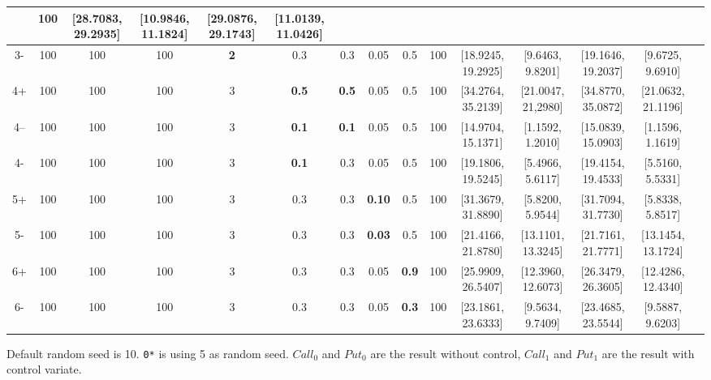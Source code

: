 \documentclass[11pt,a4paper]{article}
\begin{document}
\begin{table}[h]
{\begin{tabular}{|c|c|c|c|c|c|c|c|c|c|c|c|c|c|c|}
            & 100 
            & [28.7083, 29.2935] & [10.9846, 11.1824] 
            & [29.0876, 29.1743] & [11.0139, 11.0426]\\
            \hline
            3- & 100 & 100 & 100 & \textbf{2} & 0.3 & 0.3 & 0.05 & 0.5 
            & 100 
            & [18.9245, 19.2925] & [9.6463, 9.8201] 
            & [19.1646, 19.2037] & [9.6725, 9.6910]\\
            \hline
            4+ & 100 & 100 & 100 & 3 & \textbf{0.5} & \textbf{0.5} & 0.05 & 0.5 
            & 100
            & [34.2764, 35.2139] & [21.0047, 21,2980]
            & [34.8770, 35.0872] & [21.0632, 21.1196]\\
            \hline
            4--& 100 & 100 & 100 & 3 & \textbf{0.1} & \textbf{0.1} & 0.05 & 0.5 
            & 100
            & [14.9704, 15.1371] & [1.1592, 1.2010]
            & [15.0839, 15.0903] & [1.1596, 1.1619]\\
            \hline
            4- & 100 & 100 & 100 & 3 & \textbf{0.1} & 0.3 & 0.05 & 0.5 
            & 100
            & [19.1806, 19.5245] & [5.4966, 5.6117]
            & [19.4154, 19.4533] & [5.5160, 5.5331]\\
            \hline
            5+ & 100 & 100 & 100 & 3 & 0.3 & 0.3 & \textbf{0.10} & 0.5 
            & 100
            & [31.3679, 31.8890] & [5.8200, 5.9544] 
            & [31.7094, 31.7730] & [5.8338, 5.8517]\\
            \hline
            5- & 100 & 100 & 100 & 3 & 0.3 & 0.3 & \textbf{0.03} & 0.5 
            & 100
            & [21.4166, 21.8780] & [13.1101, 13.3245]
            & [21.7161, 21.7771] & [13.1454, 13.1724]\\
            \hline
            6+ & 100 & 100 & 100 & 3 & 0.3 & 0.3 & 0.05 & \textbf{0.9}
            & 100
            & [25.9909, 26.5407] & [12.3960, 12.6073]
            & [26.3479, 26.3605] & [12.4286, 12.4340]\\
            \hline
            6- & 100 & 100 & 100 & 3 & 0.3 & 0.3 & 0.05 & \textbf{0.3}
            & 100
            & [23.1861, 23.6333] & [9.5634, 9.7409]
            & [23.4685, 23.5544] & [9.5887, 9.6203]\\
            \hline
    \end{tabular}
        }
    \end{table}

    Default random seed is 10. 
    \texttt{0*} is using 5 as random seed.
    $Call_0$ and $Put_0$ are the result without control,
    $Call_1$ and $Put_1$ are the result with control variate.
\end{document}
